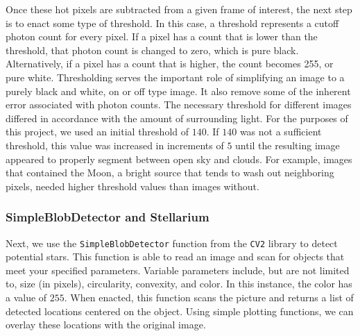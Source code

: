 Once these hot pixels are subtracted from a given frame of interest, the next step is to enact some type of threshold.
In this case, a threshold represents a cutoff photon count for every pixel.  
If a pixel has a count that is lower than the threshold, that photon count is changed to zero, which is pure black.  
Alternatively, if a pixel has a count that is higher, the  count becomes 255, or pure white.  
Thresholding serves the important role of simplifying an image to a purely black and white, on or off type image.
It also remove some of the inherent error associated with photon counts.
The necessary threshold for different images differed in accordance with the amount of surrounding light.
For the purposes of this project, we used an initial threshold of $140$.
If $140$ was not a sufficient threshold, this value was increased in increments of $5$ until the resulting image appeared to properly segment between open sky and clouds. 
For example, images that contained the Moon, a bright source that tends to wash out neighboring pixels, needed higher threshold values than images without.

\subsubsection{SimpleBlobDetector and Stellarium}

Next, we use the \texttt{SimpleBlobDetector} function from the \texttt{CV2} library to detect potential stars.
This function is able to read an image and scan for objects that meet your specified parameters.
Variable parameters include, but are not limited to, size (in pixels), circularity, convexity, and color.
In this instance, the color has a value of $255$. 
When enacted, this function scans the picture and returns a list of detected locations centered on the object.
Using simple plotting functions, we can overlay these locations with the original image.

